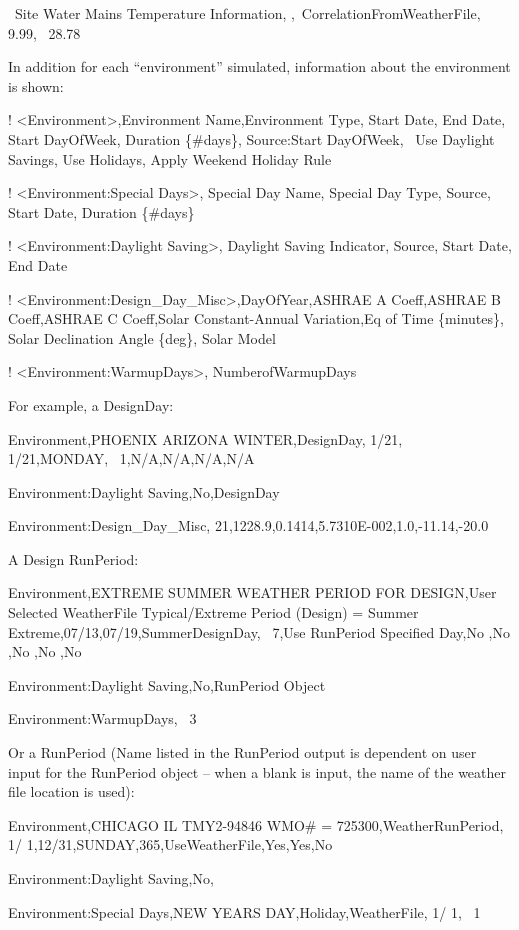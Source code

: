 ~Site Water Mains Temperature Information, ,~CorrelationFromWeatherFile,~ 9.99,~ 28.78

In addition for each ``environment'' simulated, information about the environment is shown:

! \textless{}Environment\textgreater{},Environment Name,Environment Type, Start Date, End Date, Start DayOfWeek, Duration \{\#days\}, Source:Start DayOfWeek,~ Use Daylight Savings, Use Holidays, Apply Weekend Holiday Rule

! \textless{}Environment:Special Days\textgreater{}, Special Day Name, Special Day Type, Source, Start Date, Duration \{\#days\}

! \textless{}Environment:Daylight Saving\textgreater{}, Daylight Saving Indicator, Source, Start Date, End Date

! \textless{}Environment:Design\_Day\_Misc\textgreater{},DayOfYear,ASHRAE A Coeff,ASHRAE B Coeff,ASHRAE C Coeff,Solar Constant-Annual Variation,Eq of Time \{minutes\}, Solar Declination Angle \{deg\}, Solar Model

! \textless{}Environment:WarmupDays\textgreater{}, NumberofWarmupDays

For example, a DesignDay:

Environment,PHOENIX ARIZONA WINTER,DesignDay, 1/21, 1/21,MONDAY,~ 1,N/A,N/A,N/A,N/A

Environment:Daylight Saving,No,DesignDay

Environment:Design\_Day\_Misc, 21,1228.9,0.1414,5.7310E-002,1.0,-11.14,-20.0

A Design RunPeriod:

Environment,EXTREME SUMMER WEATHER PERIOD FOR DESIGN,User Selected WeatherFile Typical/Extreme Period (Design) = Summer Extreme,07/13,07/19,SummerDesignDay,~ 7,Use RunPeriod Specified Day,No ,No ,No ,No ,No

Environment:Daylight Saving,No,RunPeriod Object

Environment:WarmupDays,~ 3

Or a RunPeriod (Name listed in the RunPeriod output is dependent on user input for the RunPeriod object -- when a blank is input, the name of the weather file location is used):

Environment,CHICAGO IL TMY2-94846 WMO\# = 725300,WeatherRunPeriod, 1/ 1,12/31,SUNDAY,365,UseWeatherFile,Yes,Yes,No

Environment:Daylight Saving,No,

Environment:Special Days,NEW YEARS DAY,Holiday,WeatherFile, 1/ 1,~ 1

